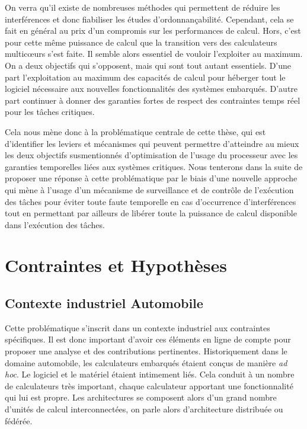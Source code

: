 \documentclass[french, a4paper, 11pt, twoside, pdftex]{StyleThese}
\begin{document}
		On verra qu'il existe de nombreuses méthodes qui permettent de réduire les interférences et donc fiabiliser les études d'ordonnançabilité. Cependant, cela se fait en général au prix d'un compromis sur les performances de calcul.
		Hors, c'est pour cette même puissance de calcul que la transition vers des calculateurs multicœurs s'est faite. Il semble alors essentiel de vouloir l'exploiter au maximum. On a deux objectifs qui s'opposent, mais qui sont tout autant essentiels. D'une part l'exploitation au maximum des capacités de calcul pour héberger tout le logiciel nécessaire aux nouvelles fonctionnalités des systèmes embarqués. D'autre part continuer à donner des garanties fortes de respect des contraintes temps réel pour les tâches critiques. 
		
		Cela nous mène donc à la problématique centrale de cette thèse, qui est d'identifier les leviers et mécanismes qui peuvent permettre d'atteindre au mieux les deux objectifs susmentionnés d'optimisation de l'usage du processeur avec les garanties temporelles liées aux systèmes critiques. 
		Nous tenterons dans la suite de proposer une réponse à cette problématique par le biais d'une nouvelle approche qui mène à l'usage d'un mécanisme de surveillance et de contrôle de l'exécution des tâches pour éviter toute faute temporelle en cas d'occurrence d'interférences tout en permettant par ailleurs de libérer toute la puissance de calcul disponible dans l'exécution des tâches.
	

\section{Contraintes et Hypothèses}
		
	\subsection{Contexte industriel Automobile}
		Cette problématique s'inscrit dans un contexte industriel aux contraintes spécifiques. Il est donc important d'avoir ces éléments en ligne de compte pour proposer une analyse et des contributions pertinentes. Historiquement dans le domaine automobile, les calculateurs embarqués étaient conçus de manière \emph{ad hoc}. Le logiciel et le matériel étaient intimement liés. Cela conduit à un nombre de calculateurs très important, chaque calculateur apportant une fonctionnalité qui lui est propre. Les architectures se composent alors d'un grand nombre d'unités de calcul interconnectées, on parle alors d'architecture distribuée ou fédérée. 
\end{document}
